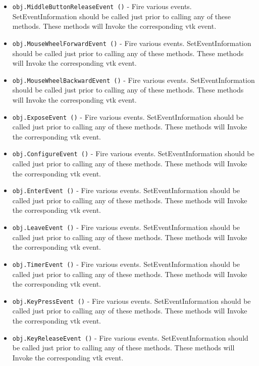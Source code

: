 \begin{itemize}
\item  \verb|obj.MiddleButtonReleaseEvent ()| -  Fire various events. SetEventInformation should be called just prior
 to calling any of these methods. These methods will Invoke the
 corresponding vtk event.

\item  \verb|obj.MouseWheelForwardEvent ()| -  Fire various events. SetEventInformation should be called just prior
 to calling any of these methods. These methods will Invoke the
 corresponding vtk event.

\item  \verb|obj.MouseWheelBackwardEvent ()| -  Fire various events. SetEventInformation should be called just prior
 to calling any of these methods. These methods will Invoke the
 corresponding vtk event.

\item  \verb|obj.ExposeEvent ()| -  Fire various events. SetEventInformation should be called just prior
 to calling any of these methods. These methods will Invoke the
 corresponding vtk event.

\item  \verb|obj.ConfigureEvent ()| -  Fire various events. SetEventInformation should be called just prior
 to calling any of these methods. These methods will Invoke the
 corresponding vtk event.

\item  \verb|obj.EnterEvent ()| -  Fire various events. SetEventInformation should be called just prior
 to calling any of these methods. These methods will Invoke the
 corresponding vtk event.

\item  \verb|obj.LeaveEvent ()| -  Fire various events. SetEventInformation should be called just prior
 to calling any of these methods. These methods will Invoke the
 corresponding vtk event.

\item  \verb|obj.TimerEvent ()| -  Fire various events. SetEventInformation should be called just prior
 to calling any of these methods. These methods will Invoke the
 corresponding vtk event.

\item  \verb|obj.KeyPressEvent ()| -  Fire various events. SetEventInformation should be called just prior
 to calling any of these methods. These methods will Invoke the
 corresponding vtk event.

\item  \verb|obj.KeyReleaseEvent ()| -  Fire various events. SetEventInformation should be called just prior
 to calling any of these methods. These methods will Invoke the
 corresponding vtk event.


\end{itemize}
